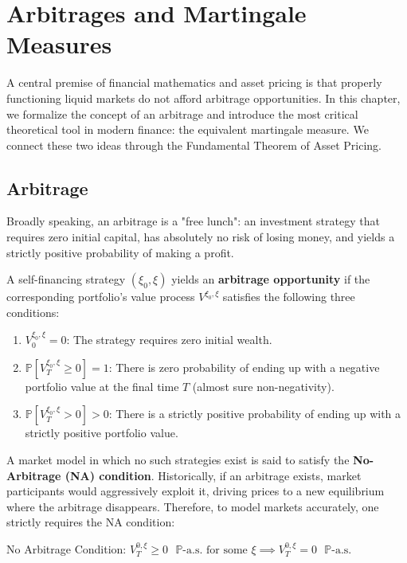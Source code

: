 \chapter{Arbitrages and Martingale Measures}
\label{chap:arbitrages_and_martingales}

A central premise of financial mathematics and asset pricing is that properly functioning liquid markets do not afford arbitrage opportunities. In this chapter, we formalize the concept of an arbitrage and introduce the most critical theoretical tool in modern finance: the equivalent martingale measure. We connect these two ideas through the Fundamental Theorem of Asset Pricing.

\section{Arbitrage}

Broadly speaking, an arbitrage is a "free lunch": an investment strategy that requires zero initial capital, has absolutely no risk of losing money, and yields a strictly positive probability of making a profit.

\begin{definition}
A self-financing strategy $(\xi_0, \xi)$ yields an \textbf{arbitrage opportunity} if the corresponding portfolio's value process $V^{\xi_0, \xi}$ satisfies the following three conditions:
\begin{enumerate}
    \item $V_0^{\xi_0, \xi} = 0$: The strategy requires zero initial wealth.
    \item $\mathbb{P}[V_T^{\xi_0, \xi} \geq 0] = 1$: There is zero probability of ending up with a negative portfolio value at the final time $T$ (almost sure non-negativity).
    \item $\mathbb{P}[V_T^{\xi_0, \xi} > 0] > 0$: There is a strictly positive probability of ending up with a strictly positive portfolio value.
\end{enumerate}
\end{definition}

A market model in which no such strategies exist is said to satisfy the \textbf{No-Arbitrage (NA) condition}. Historically, if an arbitrage exists, market participants would aggressively exploit it, driving prices to a new equilibrium where the arbitrage disappears. Therefore, to model markets accurately, one strictly requires the NA condition:
\begin{center}
    No Arbitrage Condition: \quad $V_T^{0, \xi} \geq 0 \text{ } \mathbb{P}\text{-a.s.} \text{ for some } \xi \implies V_T^{0, \xi} = 0 \text{ } \mathbb{P}\text{-a.s.}$
\end{center}

